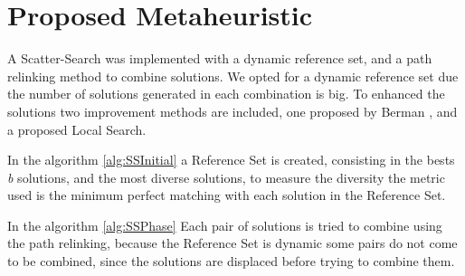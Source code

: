 \section{Proposed Metaheuristic}
A Scatter-Search was implemented
with a dynamic reference set,
and a path relinking method
to combine solutions.
We opted for a dynamic reference set
due the number of solutions generated
in each combination is big.
To enhanced the solutions
two improvement methods are included,
one proposed by Berman \cite{berman1987stochastic},
and a proposed Local Search.


In the algorithm \ref{alg:SSInitial}
a Reference Set is created,
consisting in the bests \textit{b} solutions,
and the most diverse  solutions,
to measure the diversity
the metric used is
the minimum perfect matching
with each solution in the Reference Set.


In the algorithm \ref{alg:SSPhase}
Each pair  of solutions
is tried to combine
using the path relinking,
because the Reference Set is dynamic
some pairs do not come to be combined,
since the solutions
are displaced
before trying to combine them.




